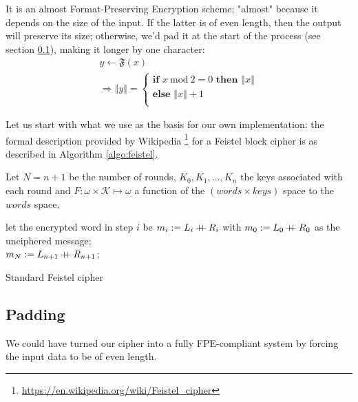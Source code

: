 \documentclass[twoside,twocolumn]{article}
\newcommand{\concat}{\mathbin{{+}\mspace{-8mu}{+}}}
\newcommand{\modulo}[1]{\ \mathrm{mod}\ #1}
\newcommand{\norm}[1]{\left\Vert#1\right\Vert}
\theoremstyle{definition}
\theoremstyle{remark}
\begin{document}
It is an almost Format-Preserving Encryption scheme; "almost" because it depends on the size of the input. If the latter is of even length, then the 
output will preserve its size; otherwise, we'd pad it at the start of the process (see section \ref{padding}), making it longer by one character:
\begin{equation}
    \label{fpe}
    \begin{array}{l}
        y \gets \mathfrak{F}(x) \\
        \Rightarrow \norm{y} = \left\{
            \begin{array}{l}
                \textbf{if } x \modulo 2 = 0 \textbf{ then } \norm{x} \\
                \textbf{else } \norm{x} + 1 \\
            \end{array}
            \right.
    \end{array}
\end{equation}

Let us start with what we use as the basis for our own implementation: the formal description provided by Wikipedia
\footnote{\url{https://en.wikipedia.org/wiki/Feistel_cipher}} for a Feistel block cipher is as described in Algorithm \ref{algo:feistel}.

Let $N = n+1$ be the number of rounds, $K_{0},K_{1},...,K_{n}$ the keys associated with each round and $F: \omega \times \mathcal{K} \mapsto \omega$ a 
function of the $(words \times keys)$ space to the $words$ space.
\begin{algorithm}
    let the encrypted word in step $i$ be $m_i := L_i \concat R_i$ with $m_0 := L_0 \concat R_0$ as the unciphered message; \\
    $m_N := L_{n+1} \concat R_{n+1}$; \\
    \caption{Standard Feistel cipher}
    \label{algo:feistel}
\end{algorithm}

\subsection{Padding}
\label{padding}

We could have turned our cipher into a fully FPE-compliant system by forcing the input data to be of even length.
\end{document}
